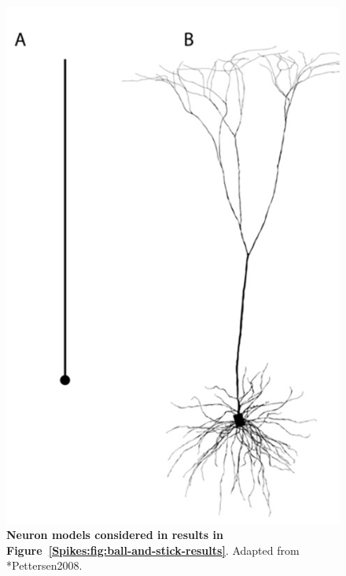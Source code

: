 \begin{figure}[!ht]
\begin{center}
\includegraphics{Figures/Spikes/Spikes-ball-and-stick-neuron-models-w43-r300}
\end{center}
\caption[]{\textbf{Neuron models considered in results in Figure~\ref{Spikes:fig:ball-and-stick-results}}. 
Adapted from \citeasnoun**{Pettersen2008}.
}
\label{Spikes:fig:ball-and-stick-neuron-models}
\end{figure}

